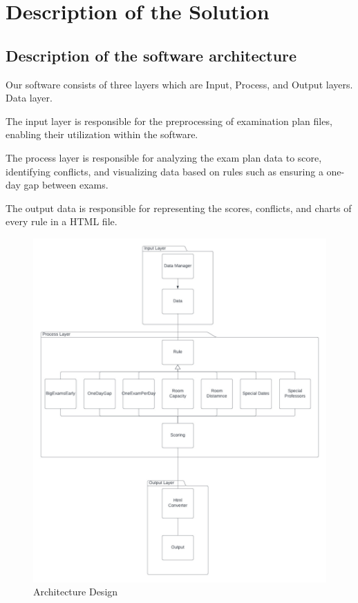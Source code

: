 


\section{Description of the Solution}
\subsection{Description of the software architecture}



Our software consists of three layers which are Input, Process, and Output layers. Data layer.

\vspace{\baselineskip}

The input layer is responsible for the preprocessing of examination plan files, enabling their utilization within the software.

\vspace{\baselineskip}

The process layer is responsible for analyzing the exam plan data to score, identifying conflicts, and visualizing data based on rules such as ensuring a one-day gap between exams.


\vspace{\baselineskip}

The output data is responsible for representing the scores, conflicts, and charts of every rule in a HTML file.

\FloatBarrier
\begin{figure}[ht]
    \centering
    \includegraphics[width=160mm]{images/architecture.jpg}
    \caption{Architecture Design}
    \label{fig:entrance-screen}
\end{figure}
\FloatBarrier



